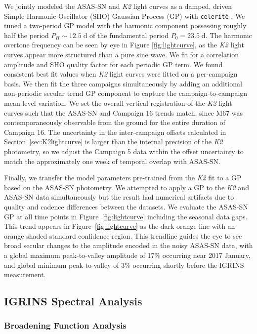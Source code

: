 \documentclass[twocolumn,tighten]{aastex631}
\begin{document}
We jointly modeled the ASAS-SN and \emph{K2} light curves as a damped, driven Simple Harmonic Oscillator (SHO) Gaussian Process (GP) with \texttt{celerit\`e} \citep{2017AJ....154..220F}.  We tuned a two-period GP model with the harmonic component possessing roughly half the period $P_H\sim12.5\;\mathrm{d}$ of the fundamental period $P_0=23.5\;\mathrm{d}$.  The harmonic overtone frequency can be seen by eye in Figure \ref{fig:lightcurve}, as the \emph{K2} light curves appear more structured than a pure sine wave.  We fit for a correlation amplitude and SHO quality factor for each periodic GP term.  We found consistent best fit values when \emph{K2} light curves were fitted on a per-campaign basis.  We then fit the three campaigns simultaneously by adding an additional non-periodic secular trend GP component to capture the campaign-to-campaign mean-level variation.  We set the overall vertical registration of the \emph{K2} light curves such that the ASAS-SN and Campaign 16 trends match, since M67 was contemporaneously observable from the ground for the entire duration of Campaign 16. The uncertainty in the inter-campaign offsets calculated in Section~\ref{sec:K2lightcurve} is larger than the internal precision of the \emph{K2} photometry, so we adjust the Campaign 5 data within the offset uncertainty to match the approximately one week of temporal overlap with ASAS-SN.  

Finally, we transfer the model parameters pre-trained from the \emph{K2} fit to a GP based on the ASAS-SN photometry. We attempted to apply a GP to the \emph{K2} and ASAS-SN data simultaneously but the result had numerical artifacts due to quality and cadence differences between the datasets. We evaluate the ASAS-SN GP at all time points in Figure~\ref{fig:lightcurve} including the seasonal data gaps.  This trend appears in Figure~\ref{fig:lightcurve} as the dark orange line with an orange shaded standard confidence region.  This trendline guides the eye to see broad secular changes to the amplitude encoded in the noisy ASAS-SN data, with a global maximum peak-to-valley amplitude of 17\% occurring near 2017 January, and global minimum peak-to-valley of 3\% occurring shortly before the IGRINS measurement.

\subsection{IGRINS Spectral Analysis}

\subsubsection{Broadening Function Analysis}
\end{document}
